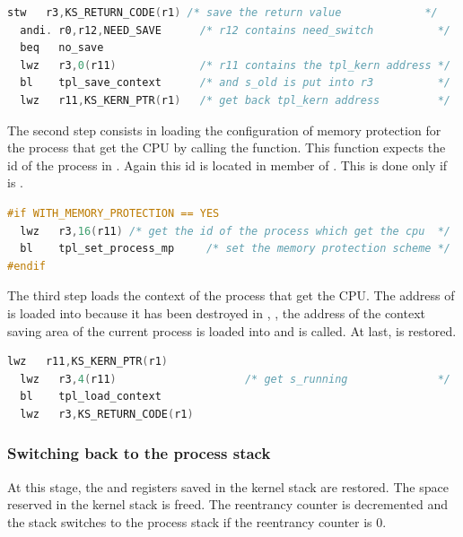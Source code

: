 \begin{lstlisting}[language=C]
  stw   r3,KS_RETURN_CODE(r1) /* save the return value             */
  andi. r0,r12,NEED_SAVE      /* r12 contains need_switch          */
  beq   no_save
  lwz   r3,0(r11)             /* r11 contains the tpl_kern address */
  bl    tpl_save_context      /* and s_old is put into r3          */
  lwz   r11,KS_KERN_PTR(r1)   /* get back tpl_kern address         */
\end{lstlisting}

The second step consists in loading the configuration of memory protection for the process that get the CPU by calling the  function. This function expects the id of the process in . Again this id is located in member  of . This is done only if  is \YES. 

\begin{lstlisting}[language=C]
#if WITH_MEMORY_PROTECTION == YES
  lwz   r3,16(r11) /* get the id of the process which get the cpu  */
  bl    tpl_set_process_mp     /* set the memory protection scheme */
#endif
\end{lstlisting}

The third step loads the context of the process that get the CPU. The address of  is loaded into  because it has been destroyed in , , the address of the context saving area of the current process is loaded into  and  is called. At last,  is restored.

\begin{lstlisting}[language=C]
  lwz   r11,KS_KERN_PTR(r1)
  lwz   r3,4(r11)                    /* get s_running              */
  bl    tpl_load_context
  lwz   r3,KS_RETURN_CODE(r1)
\end{lstlisting}

\subsubsection{Switching back to the process stack}

At this stage, the  and  registers saved in the kernel stack are restored. The space reserved in the kernel stack is freed. The reentrancy counter is decremented and the stack switches to the process stack if the reentrancy counter is 0.

